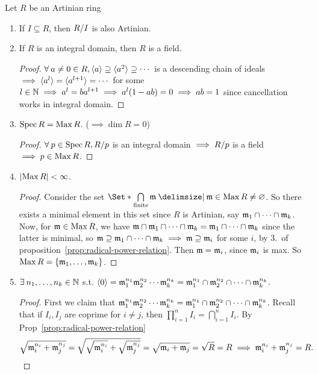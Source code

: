 \begin{prop} \label{artin-ring-basic-property}
  Let $R$ be an Artinian ring
  \begin{enumerate}[(1)]
    \item If $I \subseteq R$, then ${R}/{I}$ is also Artinian.
    \item If $R$ is an integral domain, then $R$ is a field.
      \begin{proof}
        $\forall a \neq 0 \in R, \gen{a} \supseteq \gen{a^2} \supseteq \dotsm$
        is a descending chain of ideals $\implies \langle a^l\rangle = \langle a^{l+1}\rangle = \dotsm$
        for some $l \in \mathbb{N} \implies a^l = ba^{l+1} \implies a^l(1 - ab) = 0
        \implies ab = 1$ since cancellation works in integral domain.
      \end{proof}
    \item $\operatorname{Spec} R = \operatorname{Max} R$. ($\implies \dim R = 0$)
      \begin{proof}
        $\forall p \in \Spec R, \quot{R}{p}$ is an integral domain
        $\implies {R}/{p}$ is a field $\implies p \in \operatorname{Max} R$.
      \end{proof}
    \item $\lvert\operatorname{Max} R\rvert < \infty$.
      \begin{proof}
        Consider the set $\Set*{ \bigcap\limits_{\text{finite}} \mf \given \mf \in \Max R}
        \ne \varnothing$. So there exists a minimal element in this set since $R$ is Artinian,
        say $\mathfrak{m}_1 \cap \dots \cap \mathfrak{m}_k$.  Now, for $\mathfrak{m} \in \operatorname{Max} R$, we have
        $\mathfrak{m}\cap \mathfrak{m}_1\cap \dots \cap\mathfrak{m}_k = \mathfrak{m}_1\cap \dots \cap\mathfrak{m}_k$ since the
        latter is minimal, so $\mathfrak{m} \supseteq \mathfrak{m}_1\cap \dots\cap\mathfrak{m}_k
        \implies \mathfrak{m} \supseteq \mathfrak{m}_i$ for some $i$, by 3.\ of proposition~\ref{prop:radical-power-relation}.
        Then $\mathfrak{m} = \mathfrak{m}_i$, since $\mathfrak{m}_i$ is max. So $\operatorname{Max} R = \lbrace\mathfrak{m}_1, \dots, \mathfrak{m}_k\rbrace$.
      \end{proof}
    \item $\exists n_1, \dots, n_k \in \Nb$ s.t.
      $\langle0\rangle = \mathfrak{m}_1^{n_1}\mathfrak{m}_2^{n_2} \dotsm \mathfrak{m}_k^{n_k}
      = \mathfrak{m}_1^{n_1}\cap \mathfrak{m}_2^{n_2} \cap \dots \cap \mathfrak{m}_k^{n_k}$.
      \begin{proof}
        First we claim that $\mathfrak{m}_1^{n_1}\mathfrak{m}_2^{n_2} \dotsm \mathfrak{m}_k^{n_k}
        = \mathfrak{m}_1^{n_1}\cap \mathfrak{m}_2^{n_2} \cap \dots \cap \mathfrak{m}_k^{n_k}$.
        Recall that if $I_i, I_j$ are coprime for $i \ne j$, then
        $\prod\limits_{i=1}^n I_i = \bigcap\limits_{i=1}^n I_i$.
        By Prop~\ref{prop:radical-power-relation}
         \[
          \sqrt{\mathfrak{m}_i^{n_i} + \mathfrak{m}_j^{n_j}}
          = \sqrt{\sqrt{\mathfrak{m}_i^{n_i}} + \sqrt{\mathfrak{m}_j^{n_j}}}
          = \sqrt{\mathfrak{m}_i + \mathfrak{m}_j} = \sqrt{R} = R
          \implies \mathfrak{m}_i^{n_i} + \mathfrak{m}_j^{n_j} = R.
        \]


\end{proof}
\end{enumerate}
\end{prop}
